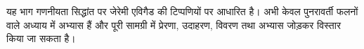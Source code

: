 \documentclass[../../include/open-logic-part]{subfiles}
\begin{document}

\begin{editorial}
  यह भाग गणनीयता सिद्धांत पर जेरेमी एविगैड की टिप्पणियों पर आधारित है। अभी
  केवल पुनरावर्ती फलनों वाले अध्याय में अभ्यास हैं और पूरी सामग्री में
  प्रेरणा, उदाहरण, विवरण तथा अभ्यास जोड़कर विस्तार किया जा सकता है।
\end{editorial}



\OLEndPartHook
\end{document}
